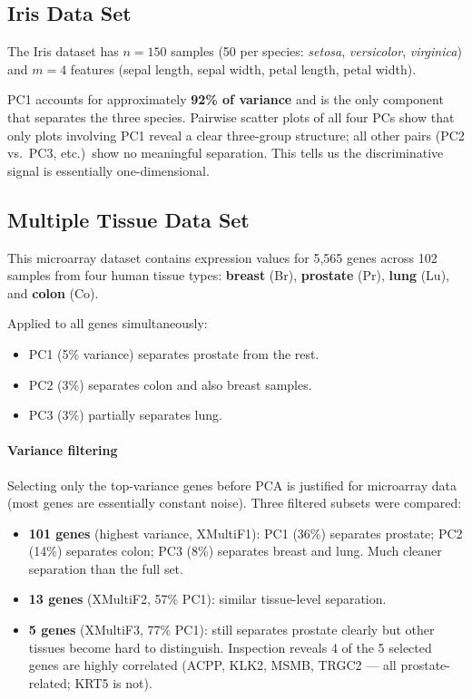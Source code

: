 \documentclass[11pt, oneside]{book}
\begin{document}
\subsection{Iris Data Set}

The Iris dataset has $n = 150$ samples (50 per species: \textit{setosa}, \textit{versicolor},
\textit{virginica}) and $m = 4$ features (sepal length, sepal width, petal length, petal width).

PC1 accounts for approximately \textbf{92\% of variance} and is the only component that
separates the three species.
Pairwise scatter plots of all four PCs show that only plots involving PC1 reveal a
clear three-group structure; all other pairs (PC2 vs.\ PC3, etc.)\ show no meaningful
separation.
This tells us the discriminative signal is essentially one-dimensional.

\subsection{Multiple Tissue Data Set}

This microarray dataset contains expression values for 5{,}565 genes across 102 samples
from four human tissue types: \textbf{breast} (Br), \textbf{prostate} (Pr),
\textbf{lung} (Lu), and \textbf{colon} (Co).

Applied to all genes simultaneously:
\begin{itemize}
  \item PC1 (5\% variance) separates prostate from the rest.
  \item PC2 (3\%) separates colon and also breast samples.
  \item PC3 (3\%) partially separates lung.
\end{itemize}

\paragraph{Variance filtering}
Selecting only the top-variance genes before PCA is justified for microarray data
(most genes are essentially constant noise).
Three filtered subsets were compared:
\begin{itemize}
  \item \textbf{101 genes} (highest variance, XMultiF1): PC1 (36\%) separates prostate;
        PC2 (14\%) separates colon; PC3 (8\%) separates breast and lung.
        Much cleaner separation than the full set.
  \item \textbf{13 genes} (XMultiF2, 57\% PC1): similar tissue-level separation.
  \item \textbf{5 genes} (XMultiF3, 77\% PC1): still separates prostate clearly but
        other tissues become hard to distinguish.
        Inspection reveals 4 of the 5 selected genes are highly correlated (ACPP, KLK2,
        MSMB, TRGC2 --- all prostate-related; KRT5 is not).
\end{itemize}
\end{document}

